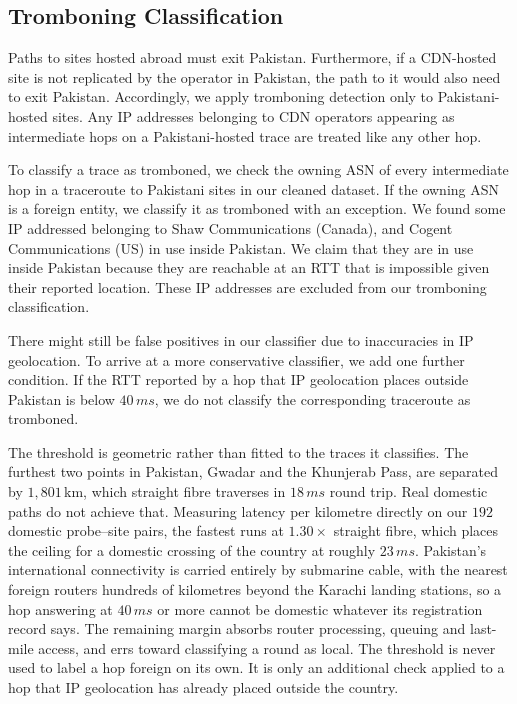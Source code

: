 \documentclass[sigconf,anonymous,10pt]{acmart}
\begin{document}
   
\subsection{Tromboning Classification}
\label{sec:detector}

Paths to sites hosted abroad must exit Pakistan. Furthermore, if a CDN-hosted site is not replicated by the operator in Pakistan, the path to it would also need to exit Pakistan. Accordingly, we apply tromboning detection only to Pakistani-hosted sites.
Any IP addresses belonging to CDN operators appearing as intermediate hops on a Pakistani-hosted trace are treated like any other hop. 

To classify a trace as tromboned, we check the owning ASN of every intermediate hop in a traceroute to Pakistani sites in our cleaned dataset. If the owning ASN is a foreign entity, we classify it as tromboned with an exception. We found some IP addressed belonging to Shaw Communications (Canada), and Cogent Communications (US) in use inside Pakistan. We claim that they are in use inside Pakistan because they are reachable at an RTT that is impossible given their reported location. These IP addresses are excluded from our tromboning classification. 

There might still be false positives in our classifier due to inaccuracies in IP geolocation. To arrive at a more conservative classifier, we add one further condition. If the RTT reported by a hop that IP geolocation places outside Pakistan is below $40\,ms$, we do not classify the corresponding traceroute as tromboned.

The threshold is geometric rather than fitted to the traces it classifies. The furthest two points in Pakistan, Gwadar and the Khunjerab Pass, are separated by $1{,}801$\,km, which straight fibre traverses in $18\,ms$ round trip. Real domestic paths do not achieve that. Measuring latency per kilometre directly on our $192$ domestic probe--site pairs, the fastest runs at $1.30\times$ straight fibre, which places the ceiling for a domestic crossing of the country at roughly $23\,ms$. Pakistan's international connectivity is carried entirely by submarine cable, with the nearest foreign routers hundreds of kilometres beyond the Karachi landing stations, so a hop answering at $40\,ms$ or more cannot be domestic whatever its registration record says. The remaining margin absorbs router processing, queuing and last-mile access, and errs toward classifying a round as local. The threshold is never used to label a hop foreign on its own. It is only an additional check applied to a hop that IP geolocation has already placed outside the country.
\end{document}
